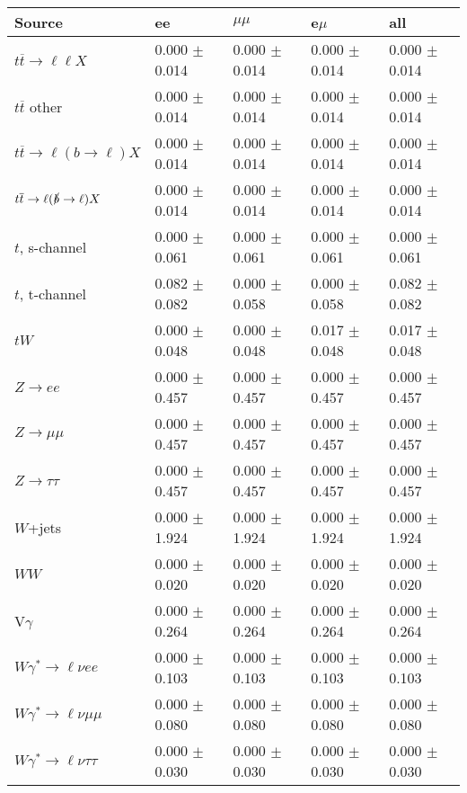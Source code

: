 \begin{tabular}{l | l l l l}
\hline\hline
 Source  &  ee  &  $\mu\mu$  &  e$\mu$  &  all \\
\hline
$t\overline{t}\rightarrow \ell\ell X$ &  0.000 $\pm$  0.014 &  0.000 $\pm$  0.014 &  0.000 $\pm$  0.014 &  0.000 $\pm$  0.014\\
$t\overline{t}$ other &  0.000 $\pm$  0.014 &  0.000 $\pm$  0.014 &  0.000 $\pm$  0.014 &  0.000 $\pm$  0.014\\
$t\overline{t}\rightarrow \ell(b\rightarrow \ell)X$ &  0.000 $\pm$  0.014 &  0.000 $\pm$  0.014 &  0.000 $\pm$  0.014 &  0.000 $\pm$  0.014\\
$t\overline{t}\rightarrow \ell(\slashed{b}\rightarrow \ell)X$ &  0.000 $\pm$  0.014 &  0.000 $\pm$  0.014 &  0.000 $\pm$  0.014 &  0.000 $\pm$  0.014\\
\hline
$t$, s-channel &  0.000 $\pm$  0.061 &  0.000 $\pm$  0.061 &  0.000 $\pm$  0.061 &  0.000 $\pm$  0.061\\
$t$, t-channel &  0.082 $\pm$  0.082 &  0.000 $\pm$  0.058 &  0.000 $\pm$  0.058 &  0.082 $\pm$  0.082\\
$tW$ &  0.000 $\pm$  0.048 &  0.000 $\pm$  0.048 &  0.017 $\pm$  0.048 &  0.017 $\pm$  0.048\\
\hline
$Z\rightarrow ee$ &  0.000 $\pm$  0.457 &  0.000 $\pm$  0.457 &  0.000 $\pm$  0.457 &  0.000 $\pm$  0.457\\
$Z\rightarrow\mu\mu$ &  0.000 $\pm$  0.457 &  0.000 $\pm$  0.457 &  0.000 $\pm$  0.457 &  0.000 $\pm$  0.457\\
$Z\rightarrow\tau\tau$ &  0.000 $\pm$  0.457 &  0.000 $\pm$  0.457 &  0.000 $\pm$  0.457 &  0.000 $\pm$  0.457\\
$W$+jets &  0.000 $\pm$  1.924 &  0.000 $\pm$  1.924 &  0.000 $\pm$  1.924 &  0.000 $\pm$  1.924\\
$WW$ &  0.000 $\pm$  0.020 &  0.000 $\pm$  0.020 &  0.000 $\pm$  0.020 &  0.000 $\pm$  0.020\\
\hline
V$\gamma$ &  0.000 $\pm$  0.264 &  0.000 $\pm$  0.264 &  0.000 $\pm$  0.264 &  0.000 $\pm$  0.264\\
$W\gamma^{*}\rightarrow\ell\nu e e$ &  0.000 $\pm$  0.103 &  0.000 $\pm$  0.103 &  0.000 $\pm$  0.103 &  0.000 $\pm$  0.103\\
$W\gamma^{*}\rightarrow\ell\nu\mu\mu$ &  0.000 $\pm$  0.080 &  0.000 $\pm$  0.080 &  0.000 $\pm$  0.080 &  0.000 $\pm$  0.080\\
$W\gamma^{*}\rightarrow\ell\nu\tau\tau$ &  0.000 $\pm$  0.030 &  0.000 $\pm$  0.030 &  0.000 $\pm$  0.030 &  0.000 $\pm$  0.030\\

\end{tabular}
